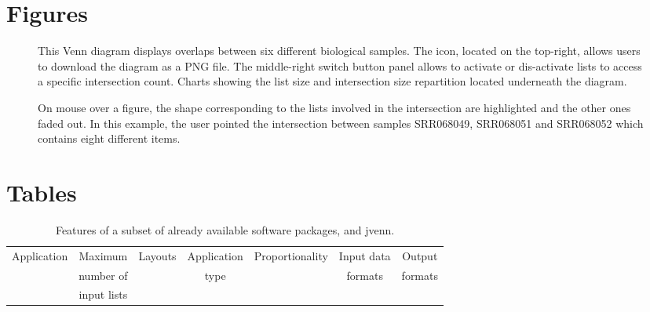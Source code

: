 \documentclass{bmcart}
\begin{document}
\begin{backmatter}


\section*{Figures}
  \begin{figure}[h!]
  \caption{
      This Venn diagram displays overlaps between six different biological
      samples. The icon, located on the top-right, allows users to download the
      diagram as a PNG file. The middle-right switch button
      panel allows to activate or dis-activate lists to access a specific
      intersection count. Charts showing the list size and intersection size 
      repartition located underneath the diagram.}
      \end{figure}

\begin{figure}[h!]
  \caption{
      On mouse over a figure, the shape corresponding to the lists involved in
      the intersection are highlighted and the other ones faded out. In
      this example, the user pointed the intersection between samples SRR068049,
      SRR068051 and SRR068052 which contains eight different items.}
      \end{figure}


\section*{Tables}

\begin{table}[h!]
\caption{Features of a subset of already available software packages, and jvenn.}
	\begin{tabular}{c|cccccc}
		Application & Maximum & Layouts & Application &
		Proportionality & Input data & Output\\ 
		& number of & & type & & formats & formats \\
		& input lists & & & & & \\ \hline
		

\end{tabular}
\end{table}
\end{backmatter}
\end{document}
